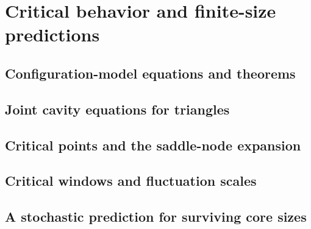 \section{Critical behavior and finite-size predictions}
\label{sec:theoretical-predictions}

\subsection{Configuration-model equations and theorems}
\label{sec:configuration-theory}

\subsection{Joint cavity equations for triangles}
\label{sec:triangle-cavity}

\subsection{Critical points and the saddle-node expansion}
\label{sec:transition-criteria}

\subsection{Critical windows and fluctuation scales}
\label{sec:fluctuation-scales}

\subsection{A stochastic prediction for surviving core sizes}
\label{sec:stochastic-approximation}

\par\allowbreak
